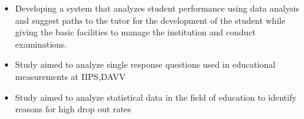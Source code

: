 \documentclass[10pt,a4paper]{altacv}
\begin{document}









\begin{itemize}
\item Developing a system that analyzes student performance using data analysis and suggest paths to the tutor for the development of the student while giving the basic facilities to manage the institution and conduct examinations.
\end{itemize}

\begin{itemize}
\item Study aimed to analyze single response questions used in educational measurements at IIPS,DAVV 
\end{itemize}

\begin{itemize}
\item Study aimed to analyze statistical data in the field of education to identify reasons for high drop out rates
\end{itemize}
\end{document}
